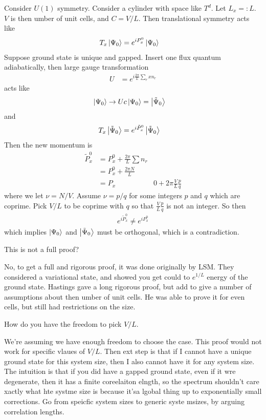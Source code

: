 Consider $U(1)$ symmetry.
Consider a cylinder with space like $T^d$.
Let $L_x=: L$.
$V$ is then umber of unit cells, and $C=V/L$.
Then translational symmetry acts like
\begin{align}
    T_x \ket{\Psi_0} &=
    e^{iP_x^0}
    \ket{\Psi_0}
\end{align}
Suppose ground state is unique and gapped.
Insert one flux quantum adiabatically,
then large gauge transformation
\begin{align}
    U &= e^{i \frac{2\pi}{L} \sum_r x n_r}
\end{align}
acts like
\begin{align}
    \ket{\Psi_0} &\to
    U c \ket{\Psi_0} = \ket{\tilde{\Psi}_0}
\end{align}
and
\begin{align}
    T_x \ket{\tilde{\Psi}_0}
    &=
    e^{i \tilde{P}_x^0}
    \ket{\tilde{\Psi}_0}
\end{align}
Then the new momentum is
\begin{align}
    \tilde{P}_x^0
    &=
    P_x^0
    +
    \frac{2\pi}{L} \sum n_r\\
    &=
    P_x^0 + \frac{2\pi N}{L}\\
    &=
    P_x&0 + 2\pi \frac{V}{L} \frac{p}{q}
\end{align}
where we let $\nu = N/V$.
Assume $\nu = p/q$ for some integers $p$ and $q$ which are coprime.
Pick $V/L$ to be coprime with $q$ so that
$\frac{V}{L} \frac{p}{q}$ is not an integer.
So then
\begin{align}
    e^{i\tilde{P}_x^0}
    \ne e^{i P_x^0}
\end{align}
which implies
$\ket{\Psi_0}$ and $\ket{\tilde{\Psi}_0}$
must be orthogonal,
which is a contradiction.

\begin{question}
    This is not a full proof?
\end{question}
No, to get a full and rigorous proof,
it was done originally by LSM.
They considered a variational state,
and showed you get could to $e^{1/L}$ energy of the ground state.
Hastings gave a long rigorous proof,
but add to give a number of assumptions about then umber of unit cells.
He was able to prove it for even cells,
but still had restrictions on the size.

\begin{question}
    How do you have the freedom to pick $V/L$.
\end{question}
We're assuming we have enough freedom to choose the case.
This proof would not work for specific vlaues of $V/L$.
Then ext step is that if I cannot have a unique ground state for this system
size,
then I also cannot have it for any system size.
The intuition is that if you did have a gapped ground state,
even if it wre degenerate,
then it has a finite coreelaiton elngth,
so the spectrum shouldn't care xactly what hte systme size is because it'sa
lgobal thing up to exponentially small corrections.
Go from speicfic system sizes to generic syste msizes,
by arguing correlation lengths.

